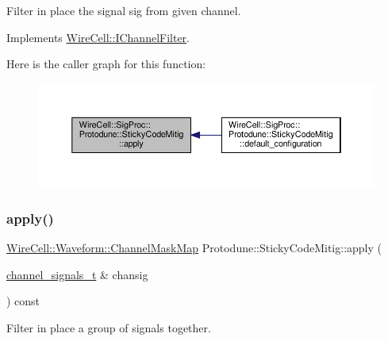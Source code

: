 Filter in place the signal {\ttfamily sig} from given {\ttfamily channel}. 

Implements \hyperlink{class_wire_cell_1_1_i_channel_filter_a6981186ee38a4b9b66e16c0d9b376b08}{Wire\+Cell\+::\+I\+Channel\+Filter}.

Here is the caller graph for this function\+:
\nopagebreak
\begin{figure}[H]
\begin{center}
\leavevmode
\includegraphics[width=350pt]{class_wire_cell_1_1_sig_proc_1_1_protodune_1_1_sticky_code_mitig_a158d7c7d804ad6548383fedba2d3f115_icgraph}
\end{center}
\end{figure}
\mbox{\label{class_wire_cell_1_1_sig_proc_1_1_protodune_1_1_sticky_code_mitig_a59d9c2567caa4f84b0e1a2cba57c0b6d}} 
\subsubsection{\texorpdfstring{apply()}{apply()}\hspace{0.1cm}{\footnotesize\ttfamily [2/2]}}
{\footnotesize\ttfamily \hyperlink{namespace_wire_cell_1_1_waveform_a18b9ae61c858e340252ba3ac83ac3bc0}{Wire\+Cell\+::\+Waveform\+::\+Channel\+Mask\+Map} Protodune\+::\+Sticky\+Code\+Mitig\+::apply (\begin{DoxyParamCaption}\item[{\hyperlink{class_wire_cell_1_1_i_channel_filter_a44de35ce47701d84cd45393c6bcd5e2f}{channel\+\_\+signals\+\_\+t} \&}]{chansig }\end{DoxyParamCaption}) const\hspace{0.3cm}{\ttfamily [virtual]}}

Filter in place a group of signals together. 

